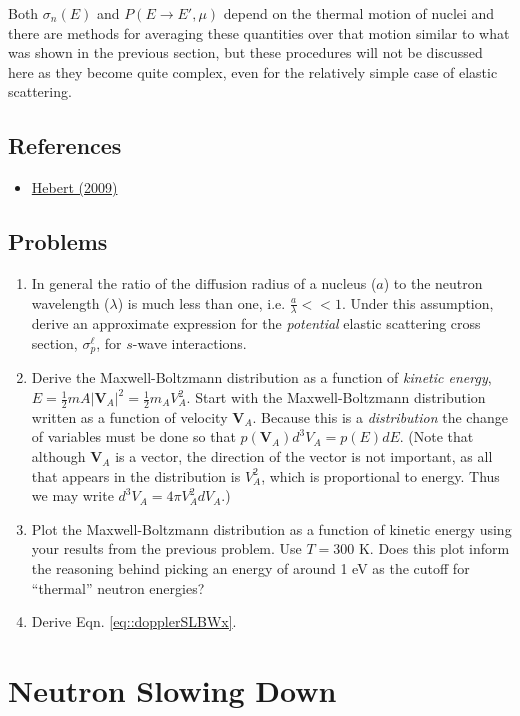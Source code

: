 \documentclass[11pt]{article}
\renewcommand\vec{\mathbf}
\begin{document}
Both \(\sigma_n(E)\) and \(P(E \rightarrow E', \mu)\) depend on the thermal motion of nuclei and there are methods for averaging these quantities over that motion similar to what was shown in the previous section, but these procedures will not be discussed here as they become quite complex, even for the relatively simple case of elastic scattering.
\subsection{References}
\label{sec:orgheadline23}
\begin{itemize}
\item \href{Hebert2009}{Hebert (2009)}
\end{itemize}
\subsection{Problems}
\label{sec:orgheadline24}
\begin{enumerate}
\item In general the ratio of the diffusion radius of a nucleus (\(a\)) to the neutron wavelength (\(\lambda\)) is much less than one, i.e. \(\frac{a}{\lambda} << 1\).  Under this assumption, derive an approximate expression for the \emph{potential} elastic scattering cross section, \(\sigma_p^\ell\), for \(s\)-wave interactions.
\item Derive the Maxwell-Boltzmann distribution as a function of \emph{kinetic energy}, \(E = \frac{1}{2}mA|\vec{V}_A|^2 = \frac{1}{2} m_A V_A^2\). Start with the Maxwell-Boltzmann distribution written as a function of velocity \(\vec{V}_A\).  Because this is a \emph{distribution} the change of variables must be done so that \(p(\vec{V}_A) d^3V_A = p(E) dE\).  (Note that although \(\vec{V}_A\) is a vector, the direction of the vector is not important, as all that appears in the distribution is \(V_A^2\), which is proportional to energy.  Thus we may write \(d^3 V_A = 4\pi V_A^2 dV_A\).)
\item Plot the Maxwell-Boltzmann distribution as a function of kinetic energy using your results from the previous problem.  Use \(T = 300\) K.  Does this plot inform the reasoning behind picking an energy of around 1 eV as the cutoff for ``thermal'' neutron energies?
\item Derive Eqn. \ref{eq::dopplerSLBWx}.
\end{enumerate}
\section{Neutron Slowing Down}
\label{sec:orgheadline41}
\end{document}
